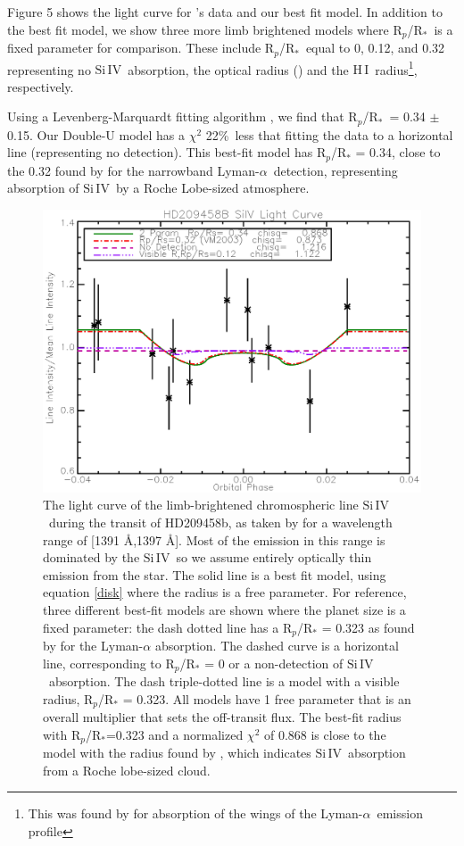\documentclass[manuscript]{aastex}
\newcommand{\hi}{\ensuremath{\mathrm{H}\,\scriptstyle \mathrm{I}}}
\newcommand{\siIV}{\ensuremath{\mathrm{Si}\,\scriptstyle \mathrm{IV}}}
\newcommand{\p}{R$_p$/R$_*$}
\newcommand{\lya}{Lyman-$\alpha$}
\begin{document}
Figure 5
 shows the light curve for \citet{vidmad}'s data and our best fit model. In addition to the best fit model, we show three more limb brightened models where \p\ is a fixed parameter for comparison. These include \p\ equal to 0, 0.12, and 0.32 representing no \siIV\ absorption, the optical radius (\citep{knutsonprop}) and the \hi\ radius\footnote{This was found by \citet{vidmad} for absorption of the wings of the \lya\ emission profile}, respectively.

Using a Levenberg-Marquardt fitting algorithm \citep{mpfit}, we find that \p\ = 0.34 $\pm$ 0.15. 
Our Double-U model has a $\chi^2$  22\%\ less that fitting the data to
a horizontal line (representing no detection). This best-fit model has
R$_p$/R$_*$ = 0.34, close to the 0.32 found by \citet{vidmad} for the narrowband \lya\ detection, representing absorption of \siIV\ by a Roche Lobe-sized atmosphere.


\begin{figure}[!ht]
\begin{center}
\includegraphics[width=0.5 \textwidth]{hd209458.eps}
\caption{The light curve of the limb-brightened chromospheric line \siIV\ during the transit of HD209458b, as taken by \citet{vidmad} for a wavelength range of [1391 \AA,1397 \AA]. Most of the emission in this range is dominated by the \siIV\, so we assume entirely optically thin emission from the star. The solid line is a best fit model, using equation \ref{disk} where the radius is a free parameter. For reference, three different best-fit models are shown where the planet size is a fixed parameter: the dash dotted line has a R$_p$/R$_*$ = 0.323 as found by \citet{vidmad} for the Lyman-$\alpha$ absorption. The dashed curve is a horizontal line, corresponding to R$_p$/R$_*$ = 0 or a non-detection of \siIV\ absorption. The dash triple-dotted line is a model with a visible radius, R$_p$/R$_*$ = 0.323. All models have 1 free parameter that is an overall multiplier that sets the off-transit flux. The best-fit radius with R$_p$/R$_*$=0.323 and a normalized $\chi^2$ of 0.868 is close to the model with the radius found by \citet{vidmad}, which indicates \siIV\ absorption from a Roche lobe-sized cloud. }
\end{center}
\label{lightc}
\end{figure}
\end{document}
